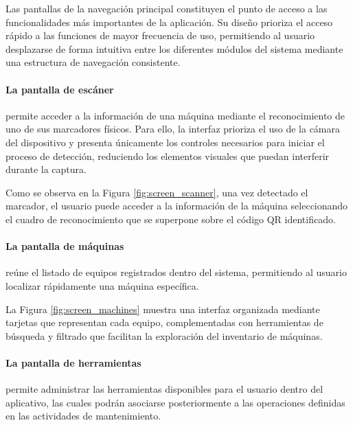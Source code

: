             Las pantallas de la navegación principal constituyen el punto de acceso a las funcionalidades más importantes de la aplicación. Su diseño prioriza el acceso rápido a las funciones de mayor frecuencia de uso, permitiendo al usuario desplazarse de forma intuitiva entre los diferentes módulos del sistema mediante una estructura de navegación consistente.

            \paragraph{La pantalla de escáner}

                permite acceder a la información de una máquina mediante el reconocimiento de uno de sus marcadores físicos. Para ello, la interfaz prioriza el uso de la cámara del dispositivo y presenta únicamente los controles necesarios para iniciar el proceso de detección, reduciendo los elementos visuales que puedan interferir durante la captura.

                

                Como se observa en la Figura \ref{fig:screen_scanner}, una vez detectado el marcador, el usuario puede acceder a la información de la máquina seleccionando el cuadro de reconocimiento que se superpone sobre el código QR identificado.

            \paragraph{La pantalla de máquinas}

                reúne el listado de equipos registrados dentro del sistema, permitiendo al usuario localizar rápidamente una máquina específica.

                

                La Figura \ref{fig:screen_machines} muestra una interfaz organizada mediante tarjetas que representan cada equipo, complementadas con herramientas de búsqueda y filtrado que facilitan la exploración del inventario de máquinas.

            \paragraph{La pantalla de herramientas}

                permite administrar las herramientas disponibles para el usuario dentro del aplicativo, las cuales podrán asociarse posteriormente a las operaciones definidas en las actividades de mantenimiento.


